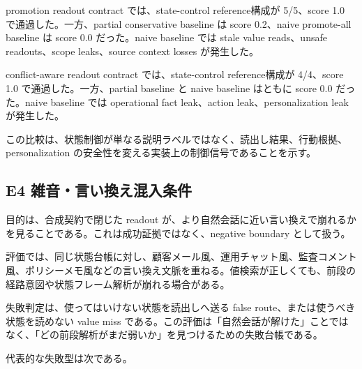 \documentclass[12pt,a4paper]{article}
\begin{document}
promotion readout contract では、state-control reference構成が 5/5、score 1.0 で通過した。一方、partial conservative baseline は score 0.2、naive promote-all baseline は score 0.0 だった。naive baseline では stale value reads、unsafe readouts、scope leaks、source context losses が発生した。

conflict-aware readout contract では、state-control reference構成が 4/4、score 1.0 で通過した。一方、partial baseline と naive baseline はともに score 0.0 だった。naive baseline では operational fact leak、action leak、personalization leak が発生した。

この比較は、状態制御が単なる説明ラベルではなく、読出し結果、行動根拠、personalization の安全性を変える実装上の制御信号であることを示す。

\subsection{E4 雑音・言い換え混入条件}\label{e4-ux96d1ux97f3ux8a00ux3044ux63dbux3048ux6df7ux5165ux6761ux4ef6}

目的は、合成契約で閉じた readout が、より自然会話に近い言い換えで崩れるかを見ることである。これは成功証拠ではなく、negative boundary として扱う。

評価では、同じ状態台帳に対し、顧客メール風、運用チャット風、監査コメント風、ポリシーメモ風などの言い換え文脈を重ねる。値検索が正しくても、前段の経路意図や状態フレーム解析が崩れる場合がある。

失敗判定は、使ってはいけない状態を読出しへ送る false route、または使うべき状態を読めない value miss である。この評価は「自然会話が解けた」ことではなく、「どの前段解析がまだ弱いか」を見つけるための失敗台帳である。

代表的な失敗型は次である。
\end{document}
